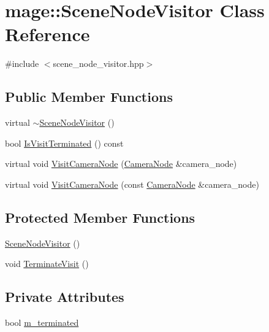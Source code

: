 \hypertarget{classmage_1_1_scene_node_visitor}{}\section{mage\+:\+:Scene\+Node\+Visitor Class Reference}
\label{classmage_1_1_scene_node_visitor}


{\ttfamily \#include $<$scene\+\_\+node\+\_\+visitor.\+hpp$>$}

\subsection*{Public Member Functions}
\begin{DoxyCompactItemize}
\item 
virtual \hyperlink{classmage_1_1_scene_node_visitor_ac45f02e28abeeb9220b0be954ca6a513}{$\sim$\+Scene\+Node\+Visitor} ()
\item 
bool \hyperlink{classmage_1_1_scene_node_visitor_a0f654e306f6d43d49081f319cd41812b}{Is\+Visit\+Terminated} () const
\item 
virtual void \hyperlink{classmage_1_1_scene_node_visitor_a01d831e494396ab678ce0c29b008a398}{Visit\+Camera\+Node} (\hyperlink{classmage_1_1_camera_node}{Camera\+Node} \&camera\+\_\+node)
\item 
virtual void \hyperlink{classmage_1_1_scene_node_visitor_a4a3bb0c3ad6253c919259efabbccfab9}{Visit\+Camera\+Node} (const \hyperlink{classmage_1_1_camera_node}{Camera\+Node} \&camera\+\_\+node)
\end{DoxyCompactItemize}
\subsection*{Protected Member Functions}
\begin{DoxyCompactItemize}
\item 
\hyperlink{classmage_1_1_scene_node_visitor_a6a259a0ce19107bb644482b86c4bd27a}{Scene\+Node\+Visitor} ()
\item 
void \hyperlink{classmage_1_1_scene_node_visitor_a8fe1b3469cbb97d4086cb030128fa28c}{Terminate\+Visit} ()
\end{DoxyCompactItemize}
\subsection*{Private Attributes}
\begin{DoxyCompactItemize}
\item 
bool \hyperlink{classmage_1_1_scene_node_visitor_a3f3b8db683cdb5b9c09c1426738ee73a}{m\+\_\+terminated}
\end{DoxyCompactItemize}


